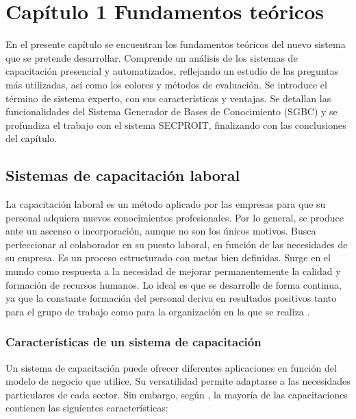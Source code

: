 \chapter*{Capítulo 1 \vspace{0.5cm} \break Fundamentos teóricos}
\setcounter{chapter}{1}

En el presente capítulo se encuentran los fundamentos teóricos del nuevo sistema que se pretende desarrollar. Comprende un análisis de los sistemas de capacitación presencial y automatizados, reflejando un estudio de las preguntas más utilizadas, así como los colores y métodos de evaluación. Se introduce el término de sistema experto, con sus características y ventajas. Se detallan las funcionalidades del Sistema Generador de Bases de Conocimiento (SGBC) y se profundiza el trabajo con el sistema SECPROIT, finalizando con las conclusiones del capítulo.


\section{Sistemas de capacitación laboral}
La capacitación laboral es un método aplicado por las empresas para que su personal adquiera nuevos conocimientos profesionales. Por lo general, se produce ante un ascenso o incorporación, aunque no son los únicos motivos. Busca perfeccionar al colaborador en su puesto laboral, en función de las necesidades de su empresa. Es un proceso estructurado con metas bien definidas. Surge en el mundo como respuesta a la necesidad de mejorar permanentemente la calidad y formación de recursos humanos. Lo ideal es que se desarrolle de forma continua, ya que la constante formación del personal deriva en resultados positivos tanto para el grupo de trabajo como para la organización en la que se realiza \cite{Denby2010}.

\subsection{Características de un sistema de capacitación}
Un sistema de capacitación puede ofrecer diferentes aplicaciones en función del modelo de negocio que utilice. Su versatilidad permite adaptarse a las necesidades particulares de cada sector. Sin embargo, según \cite{Paez2022}, la mayoría de las capacitaciones contienen las siguientes características:


